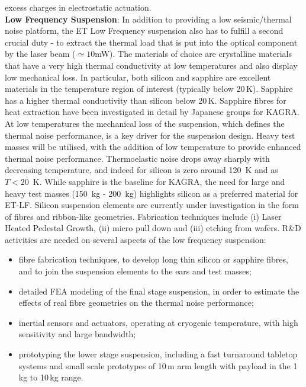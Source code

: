 excess charges in electrostatic actuation.\\
{\bfseries Low Frequency Suspension}: In addition to providing a low seismic/thermal noise platform, the ET Low Frequency suspension also has to fulfill a second crucial duty - to extract the thermal load that is put into the optical component by the laser beam ($\simeq 10 $mW). The materials of choice are crystalline materials that have a very high thermal conductivity at low temperatures and also display low mechanical loss. In particular, both silicon and sapphire are excellent materials in the temperature region of interest (typically below 20\,K). Sapphire has a higher thermal conductivity than silicon below 20\,K. Sapphire fibres for heat extraction have been investigated in detail by Japanese groups for KAGRA. At low temperatures the mechanical loss of the suspension, which defines the thermal noise performance, is a key driver for the suspension design. Heavy test masses will be utilised, with the addition of low temperature to provide enhanced thermal noise performance. Thermoelastic noise drops away sharply with decreasing temperature, and indeed for silicon is zero around 120~K and as $T<20$~K. While sapphire is the baseline for KAGRA, the need for large and heavy test masses (150~kg - 200~kg) highlights silicon as a preferred material for ET-LF.  Silicon suspension elements are currently under investigation in the form of fibres and ribbon-like geometries. Fabrication techniques include (i) Laser Heated Pedestal Growth, (ii) micro pull down and (iii) etching from wafers. R\&D activities are needed on several aspects of the low frequency suspension:
\begin{itemize}
\item fibre fabrication techniques, to develop long thin silicon or sapphire fibres, and to join the suspension elements to the ears and test masses;
\item detailed FEA modeling of the final stage suspension, in order to estimate the effects of real fibre geometries on the thermal noise performance;
\item inertial sensors and actuators, operating at cryogenic temperature, with high sensitivity and large bandwidth; 
\item prototyping the lower stage suspension, including a fast turnaround tabletop systems and small scale prototypes of 10\,m arm length with payload in the 1\,kg to 10\,kg range.%
\end{itemize}

